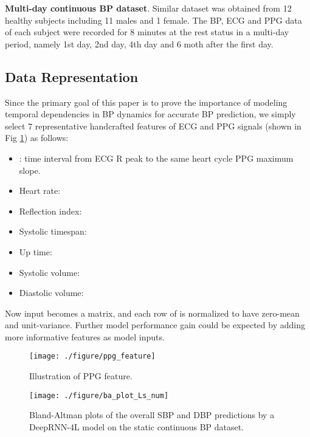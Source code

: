 \documentclass[letterpaper, 10 pt, conference]{ieeeconf}
\begin{document}
\textbf{Multi-day continuous BP dataset}.
Similar dataset was obtained from 12 healthy subjects including 11 males and 1 female.
The BP, ECG and PPG data of each subject were recorded for 8 minutes at the rest status in a multi-day period, namely 1st day, 2nd day, 4th day and 6 moth after the first day.


\subsection{Data Representation}
Since the primary goal of this paper is to prove the importance of modeling temporal dependencies in BP dynamics for accurate BP prediction, we simply select 7 representative handcrafted features of ECG and PPG signals (shown in Fig \ref{fig:PPG_feature}) as follows:
\begin{itemize}
\item : time interval from ECG R peak to the same heart cycle PPG maximum slope.
\item Heart rate: 
\item Reflection index:  
\item Systolic timespan:  
\item Up time:    
\item Systolic volume:  
\item Diastolic volume:  
\end{itemize}

Now input  becomes a  matrix,
and each row of  is normalized to have zero-mean and unit-variance. 
Further model performance gain could be expected by adding more informative features as model inputs.

\begin{figure}
\centering
\texttt{[image: ./figure/ppg\_feature]}
\caption{Illustration of PPG feature.}
\label{fig:PPG_feature}
\end{figure}

\begin{figure*}
\centering
\texttt{[image: ./figure/ba\_plot\_Ls\_num]}
\caption{Bland-Altman plots of the overall SBP and DBP predictions by a DeepRNN-4L model on the static continuous BP dataset.}
\label{fig:ba_plot}
\end{figure*}
\end{document}
